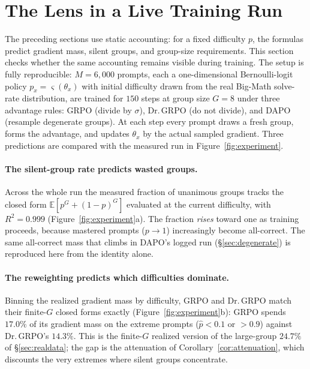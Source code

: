 \documentclass[11pt]{article}
\theoremstyle{plain}
\theoremstyle{definition}
\newcommand{\E}{\mathbb{E}}
\begin{document}
\section{The Lens in a Live Training Run}
\label{sec:experiment}

The preceding sections use static accounting: for a fixed difficulty $p$, the formulas predict gradient mass, silent groups, and group-size requirements. This section checks whether the same accounting remains visible during training. The setup is fully reproducible: $M=6{,}000$ prompts, each a one-dimensional Bernoulli-logit policy $p_x=\varsigma(\theta_x)$ with initial difficulty drawn from the real Big-Math solve-rate distribution, are trained for $150$ steps at group size $G=8$ under three advantage rules: GRPO (divide by $\sigma$), Dr.\,GRPO (do not divide), and DAPO (resample degenerate groups). At each step every prompt draws a fresh group, forms the advantage, and updates $\theta_x$ by the actual sampled gradient. Three predictions are compared with the measured run in Figure~\ref{fig:experiment}.

\paragraph{The silent-group rate predicts wasted groups.} Across the whole run the measured fraction of unanimous groups tracks the closed form $\E[p^{G}+(1-p)^{G}]$ evaluated at the current difficulty, with $R^2=0.999$ (Figure~\ref{fig:experiment}a). The fraction \emph{rises} toward one as training proceeds, because mastered prompts ($p\to1$) increasingly become all-correct. The same all-correct mass that climbs in DAPO's logged run (\S\ref{sec:degenerate}) is reproduced here from the identity alone.

\paragraph{The reweighting predicts which difficulties dominate.} Binning the realized gradient mass by difficulty, GRPO and Dr.\,GRPO match their finite-$G$ closed forms exactly (Figure~\ref{fig:experiment}b): GRPO spends $17.0\%$ of its gradient mass on the extreme prompts ($\hat p<0.1$ or $>0.9$) against Dr.\,GRPO's $14.3\%$. This is the finite-$G$ realized version of the large-group $24.7\%$ of \S\ref{sec:realdata}; the gap is the attenuation of Corollary~\ref{cor:attenuation}, which discounts the very extremes where silent groups concentrate.
\end{document}
